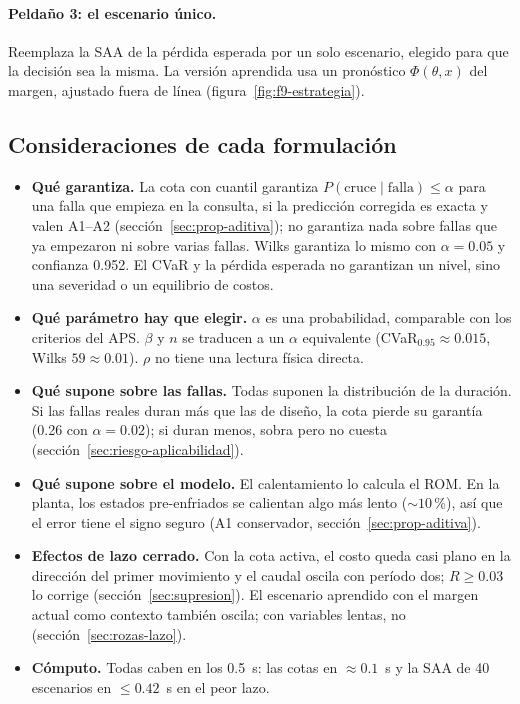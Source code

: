 \paragraph{Peldaño 3: el escenario único.} Reemplaza la SAA de la pérdida esperada por un solo
escenario, elegido para que la decisión sea la misma. La versión aprendida usa un pronóstico
$\Phi(\theta,x)$ del margen, ajustado fuera de línea (figura~\ref{fig:f9-estrategia}).

\subsection{Consideraciones de cada formulación}
\begin{itemize}
  \item \textbf{Qué garantiza.} La cota con cuantil garantiza $P(\text{cruce}\mid\text{falla})\le\alpha$
        para una falla que empieza en la consulta, si la predicción corregida es exacta y valen A1--A2
        (sección~\ref{sec:prop-aditiva}); no garantiza nada sobre fallas que ya empezaron ni sobre
        varias fallas. Wilks garantiza lo mismo con $\alpha=0.05$ y confianza 0.952. El CVaR y la
        pérdida esperada no garantizan un nivel, sino una severidad o un equilibrio de costos.
  \item \textbf{Qué parámetro hay que elegir.} $\alpha$ es una probabilidad, comparable con los
        criterios del APS. $\beta$ y $n$ se traducen a un $\alpha$ equivalente (CVaR$_{0.95}\approx0.015$,
        Wilks $59\approx0.01$). $\rho$ no tiene una lectura física directa.
  \item \textbf{Qué supone sobre las fallas.} Todas suponen la distribución de la duración. Si las
        fallas reales duran más que las de diseño, la cota pierde su garantía (0.26 con
        $\alpha=0.02$); si duran menos, sobra pero no cuesta (sección~\ref{sec:riesgo-aplicabilidad}).
  \item \textbf{Qué supone sobre el modelo.} El calentamiento lo calcula el ROM. En la planta, los
        estados pre-enfriados se calientan algo más lento ($\sim10$\,\%), así que el error tiene el
        signo seguro (A1 conservador, sección~\ref{sec:prop-aditiva}).
  \item \textbf{Efectos de lazo cerrado.} Con la cota activa, el costo queda casi plano en la
        dirección del primer movimiento y el caudal oscila con período dos; $R\ge0.03$ lo corrige
        (sección~\ref{sec:supresion}). El escenario aprendido con el margen actual como contexto
        también oscila; con variables lentas, no (sección~\ref{sec:rozas-lazo}).
  \item \textbf{Cómputo.} Todas caben en los 0.5~s: las cotas en $\approx0.1$~s y la SAA de 40
        escenarios en $\le0.42$~s en el peor lazo.
\end{itemize}

